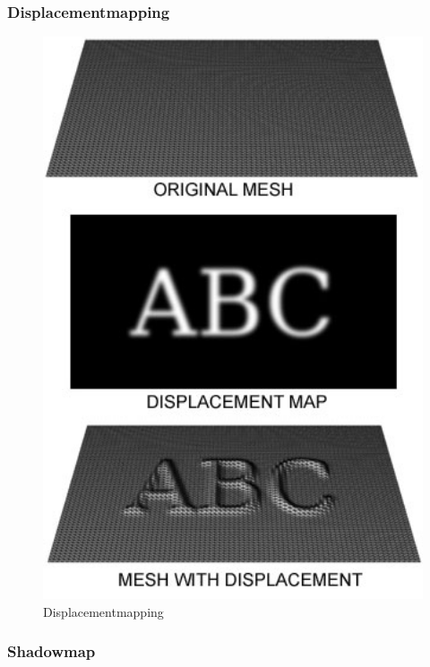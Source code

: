 \subsubsection{Displacementmapping}



\begin{figure}[H]
    \centering
    \includegraphics[width=1.0\textwidth]{images/Displacement.jpg}
    \caption{Displacementmapping}
\end{figure}



\subsubsection{Shadowmap}


